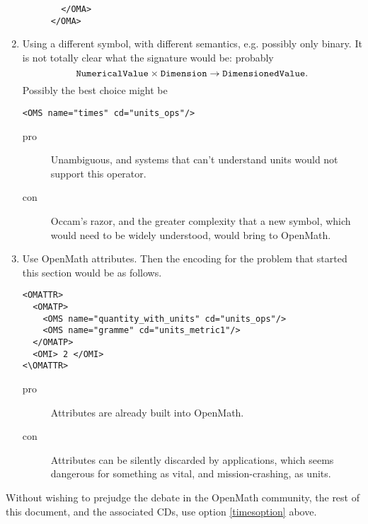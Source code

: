 \documentclass[11pt]{openmathTN}
\begin{document}
\begin{enumerate}
\begin{description}
\begin{verbatim}
  </OMA>
</OMA>
\end{verbatim}
\end{description}
\item Using a different symbol, with different semantics, e.g. possibly
only binary. It is not totally clear what the signature would be: probably
$$
\verb+NumericalValue+\times\verb+Dimension+\rightarrow\verb+DimensionedValue+.
$$
Possibly the best choice might be
\begin{verbatim}
<OMS name="times" cd="units_ops"/>
\end{verbatim}
\begin{description}
\item[pro]Unambiguous, and systems that can't understand units would not
support this operator.
\item[con]Occam's razor, and the greater complexity that a new symbol,
which would need to be widely understood, would bring to OpenMath.
\end{description}
\item\label{unitsattributes}Use OpenMath attributes. Then the encoding for
the problem that started this section would be as follows.
\begin{verbatim}
<OMATTR>
  <OMATP>
    <OMS name="quantity_with_units" cd="units_ops"/>
    <OMS name="gramme" cd="units_metric1"/>
  </OMATP>
  <OMI> 2 </OMI>
<\OMATTR>
\end{verbatim}
\begin{description}
\item[pro]Attributes are already built into OpenMath.
\item[con]Attributes can be silently discarded by applications, which seems
dangerous for something as vital, and mission-crashing, as units.
\end{description}
\end{enumerate}
Without wishing to prejudge the debate in the OpenMath community, the rest
of this document, and the associated CDs, use option \ref{timesoption}
above.
\end{document}
